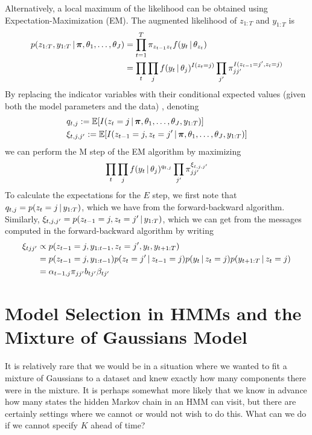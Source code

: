   Alternatively, a local maximum of the likelihood can be obtained using
  Expectation-Maximization (EM).  The augmented likelihood of 
  $z_{1:T}$ and $y_{1:T}$ is
  \begin{align}
    p(z_{1:T}, y_{1:T} \, \vert \, \boldsymbol{\pi}, \theta_1, \dots, \theta_J) &=
                                                                 \prod_{t=1}^T \pi_{z_{t-1}z_t} f(y_t \, \vert \, \theta_{z_t}) \\
    &= \prod_{t} \prod_j f(y_t \, \vert \, \theta_j)^{I(z_t = j)}
      \prod_{j'} \pi_{jj'}^{I(z_{t-1} = j', z_t = j)}
  \end{align}
  By replacing the indicator variables with their conditional expected
  values (given both the model parameters and the data) , denoting
  \begin{align}
    &q_{t,j} := \mathbb{E}[I(z_t = j \, \vert \, \boldsymbol{\pi}, \theta_1, \dots, \theta_J, y_{1:T})] \\
    &\xi_{t,j,j'} := \mathbb{E}[I(z_{t-1} = j, z_{t} = j' \, \vert \, \boldsymbol{\pi}, \theta_1, \dots, \theta_J, y_{1:T})]
  \end{align}
  we can perform the M step of the EM algorithm by maximizing
  \begin{align}
    \prod_{t} \prod_j f(y_t \, \vert \, \theta_j)^{q_{t,j}}
      \prod_{j'} \pi_{jj'}^{\xi_{t,j,j'}}
  \end{align}
  To calculate the expectations for the $E$ step, we first note that
  $q_{t,j} = p(z_t = j \, \vert \, y_{1:T})$, which we have from the
  forward-backward algorithm.  Similarly, $\xi_{t,j,j'} = p(z_{t-1} =
  j, z_t = j' \, \vert \, y_{1:T})$, which we can get from the messages
  computed in the forward-backward algorithm by writing
  \begin{align}
    \xi_{tjj'} &\propto p(z_{t-1} = j, 
    y_{1:t-1}, z_t = j', y_t, y_{t+1:T}) \\
                                            &= p(z_{t-1} = j, y_{1:t-1}) p(z_t = j' \, \vert \, z_{t-1} = j)
    p(y_t \, \vert \, z_t = j)
      p(y_{t+1:T} \, \vert \, z_t = j) \\
    &= \alpha_{t-1,j} \pi_{jj'} b_{tj'} \beta_{tj'}
  \end{align}

\section{Model Selection in HMMs and the Mixture of Gaussians Model}
\label{sec:model-select-mixt}

It is relatively rare that we would be in a situation where we wanted
to fit a mixture of Gaussians to a dataset and knew exactly how many
components there were in the mixture.  It is perhaps somewhat more
likely that we know in advance how many
states the hidden Markov chain in an HMM can visit, but there are
certainly settings where we cannot or would not wish to do this. 
What can we do if we cannot specify $K$ ahead of time?

